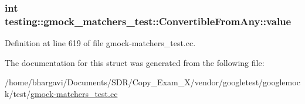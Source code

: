 \subsubsection[{\texorpdfstring{value}{value}}]{\setlength{\rightskip}{0pt plus 5cm}int testing\+::gmock\+\_\+matchers\+\_\+test\+::\+Convertible\+From\+Any\+::value}\hypertarget{structtesting_1_1gmock__matchers__test_1_1_convertible_from_any_a7d18bc7eb4d6eaae32d581e7c204f917}{}\label{structtesting_1_1gmock__matchers__test_1_1_convertible_from_any_a7d18bc7eb4d6eaae32d581e7c204f917}


Definition at line 619 of file gmock-\/matchers\+\_\+test.\+cc.



The documentation for this struct was generated from the following file\+:\begin{DoxyCompactItemize}
\item 
/home/bhargavi/\+Documents/\+S\+D\+R/\+Copy\+\_\+\+Exam\+\_\+X/vendor/googletest/googlemock/test/\hyperlink{gmock-matchers__test_8cc}{gmock-\/matchers\+\_\+test.\+cc}\end{DoxyCompactItemize}
